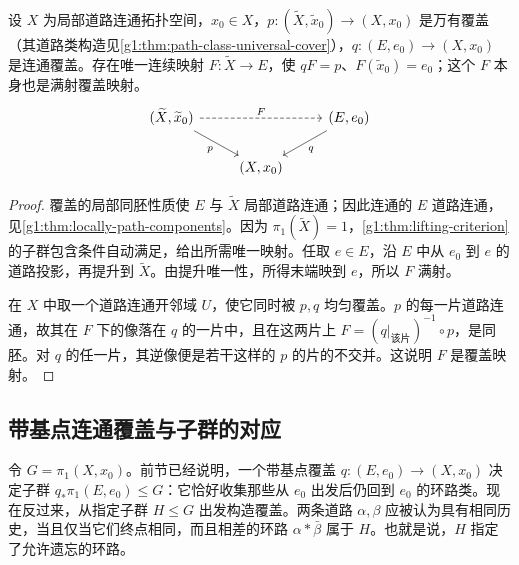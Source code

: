 \begin{corollary}\label{g1:cor:universal-cover-map}
	设 \(X\) 为局部道路连通拓扑空间，\(x_0\in X\)，\(p:(\widetilde X,\widetilde x_0)\to(X,x_0)\) 是万有覆盖（其道路类构造见\cref{g1:thm:path-class-universal-cover}），\(q:(E,e_0)\to(X,x_0)\) 是连通覆盖。存在唯一连续映射 \(F:\widetilde X\to E\)，使 \(qF=p\)、\(F(\widetilde x_0)=e_0\)；这个 \(F\) 本身也是满射覆盖映射。
	\[
		\begin{tikzcd}
			(\widetilde X,\widetilde x_0)\arrow[rr,dashed,"F"]\arrow[dr,"p"']&&(E,e_0)\arrow[dl,"q"]\\
			&(X,x_0)&
		\end{tikzcd}
	\]
\end{corollary}
\begin{proof}
	覆盖的局部同胚性质使 \(E\) 与 \(\widetilde X\) 局部道路连通；因此连通的 \(E\) 道路连通，见\cref{g1:thm:locally-path-components}。因为 \(\pi_1(\widetilde X)=1\)，\cref{g1:thm:lifting-criterion}的子群包含条件自动满足，给出所需唯一映射。任取 \(e\in E\)，沿 \(E\) 中从 \(e_0\) 到 \(e\) 的道路投影，再提升到 \(\widetilde X\)。由提升唯一性，所得末端映到 \(e\)，所以 \(F\) 满射。

	在 \(X\) 中取一个道路连通开邻域 \(U\)，使它同时被 \(p,q\) 均匀覆盖。\(p\) 的每一片道路连通，故其在 \(F\) 下的像落在 \(q\) 的一片中，且在这两片上 \(F=(q|_{\text{该片}})^{-1}\circ p\)，是同胚。对 \(q\) 的任一片，其逆像便是若干这样的 \(p\) 的片的不交并。这说明 \(F\) 是覆盖映射。
\end{proof}

\subsection{带基点连通覆盖与子群的对应}
\label{g1:subsec:0504:03}

令 \(G=\pi_1(X,x_0)\)。前节已经说明，一个带基点覆盖 \(q:(E,e_0)\to(X,x_0)\) 决定子群 \(q_*\pi_1(E,e_0)\le G\)：它恰好收集那些从 \(e_0\) 出发后仍回到 \(e_0\) 的环路类。现在反过来，从指定子群 \(H\le G\) 出发构造覆盖。两条道路 \(\alpha,\beta\) 应被认为具有相同历史，当且仅当它们终点相同，而且相差的环路 \(\alpha*\bar\beta\) 属于 \(H\)。也就是说，\(H\) 指定了允许遗忘的环路。

